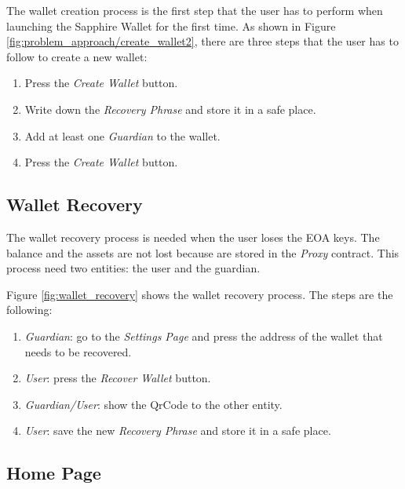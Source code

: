 The wallet creation process is the first step that the user has to perform when launching the Sapphire Wallet for the first time. As shown in Figure \ref{fig:problem_approach/create_wallet2}, there are three steps that the user has to follow to create a new wallet:

\begin{enumerate}
    \item Press the \textit{Create Wallet} button.
    \item Write down the \textit{Recovery Phrase} and store it in a safe place.
    \item Add at least one \textit{Guardian} to the wallet.
    \item Press the \textit{Create Wallet} button.
\end{enumerate}


\subsection{Wallet Recovery}
\label{subsec:wallet_recovery}

The wallet recovery process is needed when the user loses the EOA keys. The balance and the assets are not lost because are stored in the \textit{Proxy} contract. This process need two entities: the user and the guardian. 

Figure \ref{fig:wallet_recovery} shows the wallet recovery process. The steps are the following:
\begin{enumerate}
    \item \textit{Guardian}: go to the \textit{Settings Page} and press the address of the wallet that needs to be recovered.
    \item \textit{User}: press the \textit{Recover Wallet} button.
    \item \textit{Guardian/User}: show the QrCode to the other entity.
    \item \textit{User}: save the new \textit{Recovery Phrase} and store it in a safe place.
\end{enumerate}


\subsection{Home Page}
\label{subsec:wallet_home_page}

